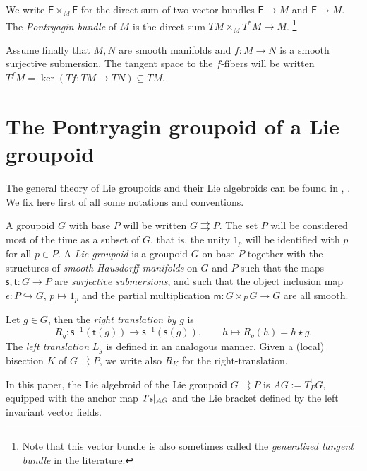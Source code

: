 \documentclass{amsart}
\theoremstyle{definition}
\begin{document}
\medskip

We write  $\mathsf E\times_M\mathsf F$ for the direct sum 
of two vector bundles $\mathsf E\to M$ and $\mathsf F\to M$.
The \emph{Pontryagin bundle} of $M$ is the direct sum $TM\times_M T^*M\to M$.
\footnote{Note that this vector bundle is also
sometimes called the \emph{generalized tangent bundle} in the literature.}

\medskip

Assume finally that $M,N$ are smooth manifolds and  $f:M\to N$
is a smooth surjective submersion. The tangent space 
to the $f$-fibers will be written $T^fM=\ker(Tf:TM\to TN)\subseteq TM$.

\section{The Pontryagin groupoid of a Lie groupoid}\label{generalities}

The general theory of Lie groupoids and their Lie algebroids can be found 
in \cite{Mackenzie05}, \cite{MoMr03}. We fix here first of all some notations and conventions.

A groupoid $G$ with base $P$ will be written  $G{{\rightrightarrows}} P$. 
The set $P$ will be considered  most of the time as a subset of $G$, that is, the unity
$1_p$ will be identified 
 with $p$ for all $p\in P$.
A \emph{Lie groupoid}
is a groupoid $G$ on base $P$ together with the structures of \emph{smooth Hausdorff manifolds}
on $G$ and $P$ such that
the maps ${{\mathsf{s}}},{{\mathsf{t}}}:G\to P$ are \emph{surjective submersions}, and such that
the object inclusion 
map $\epsilon:P\hookrightarrow G$, $p\mapsto 1_p$  and the partial multiplication
$\mathsf m:G\times_PG\to G$ are all smooth.

Let $g\in G$, then the \emph{right translation by} $g$ is
\[R_g:{{\mathsf{s}}}{^{-1}}({{\mathsf{t}}}(g))\to{{\mathsf{s}}}{^{-1}}({{\mathsf{s}}}(g)), \qquad h \mapsto R_g(h)=h\star g. 
\]
The \emph{left translation} $L_g$ is defined in an analogous manner.
Given a (local) bisection $K$ of $G{{\rightrightarrows}} P$, we write also $R_K$ for the right-translation.

\medskip

In this paper, the Lie algebroid of the Lie groupoid $G{{\rightrightarrows}} P$ 
is $AG:=T^{{\mathsf{t}}}_PG$, equipped with the anchor map
$T{{\mathsf{s}}}{\arrowvert_{{AG}}}$ and the Lie bracket defined by the left invariant vector fields.

\medskip
\end{document}
